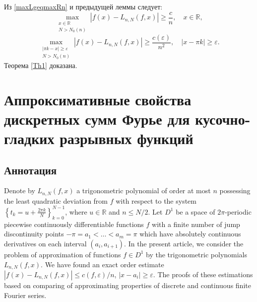 
Из \eqref{maxLgeqmaxRn}  и предыдущей леммы следует:
$$
\max_{\substack{x \in \mathbb{R} \\ N > N_0(n)}}\left|f(x) - L_{n,N}(f,x)\right| \geq \frac{c}{n}, \quad x \in \mathbb{R},
$$
$$
\max_{\substack{\left|\pi k - x\right| \geq \varepsilon \\ N > N_0(n)}} \left|f(x) - L_{n,N}(f,x)\right| \geq \frac{c(\varepsilon)}{n^2},\quad \left|x - \pi k\right| \geq \varepsilon.
$$
Теорема \ref{Th1} доказана.

\section{Аппроксимативные свойства дискретных сумм Фурье для кусочно-гладких разрывных функций}
\subsection{Аннотация}
Denote by $L_{n,N}(f,x)$ 
a trigonometric polynomial of order at most $n$ possessing the least quadratic deviation from $f$ with respect to the system
$\left\{t_k = u + \frac{2\pi k}{N}\right\}_{k=0}^{N-1}$, where $u \in \mathbb{R}$ and $n \leq N/2$. 
Let $D^1$ be a space of $2\pi$-periodic piecewise continuously differentiable functions $f$ with a finite number of jump discontinuity points $-\pi = a_1 < \ldots < a_m = \pi$ which have absolutely continuous derivatives on each interval $(a_i, a_{i+1})$.
In the present article, we consider the problem of approximation of functions $f \in D^1$  by the trigonometric polynomials $L_{n,N}(f,x)$.
We have found an exact order estimate $\left|f(x) - L_{n,N}(f,x)\right| \leq c(f,\varepsilon)/n$, $\left|x - a_i\right| \geq \varepsilon$.
The proofs of these estimations based on comparing of approximating properties of discrete and continuous finite Fourier series.
